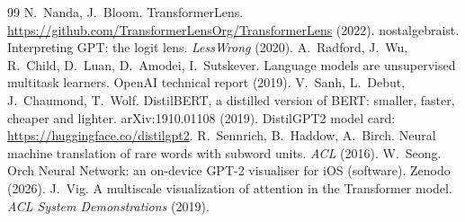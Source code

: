 \documentclass[11pt]{article}
\begin{document}
\begin{thebibliography}{99}
 N.~Nanda, J.~Bloom. TransformerLens. \url{https://github.com/TransformerLensOrg/TransformerLens} (2022).
 nostalgebraist. Interpreting GPT: the logit lens. \emph{LessWrong} (2020).
 A.~Radford, J.~Wu, R.~Child, D.~Luan, D.~Amodei, I.~Sutskever. Language models are unsupervised multitask learners. OpenAI technical report (2019).
 V.~Sanh, L.~Debut, J.~Chaumond, T.~Wolf. DistilBERT, a distilled version of BERT: smaller, faster, cheaper and lighter. arXiv:1910.01108 (2019). DistilGPT2 model card: \url{https://huggingface.co/distilgpt2}.
 R.~Sennrich, B.~Haddow, A.~Birch. Neural machine translation of rare words with subword units. \emph{ACL} (2016).
 W.~Seong. Orch Neural Network: an on-device GPT-2 visualiser for iOS (software). Zenodo (2026). 
 J.~Vig. A multiscale visualization of attention in the Transformer model. \emph{ACL System Demonstrations} (2019).
\end{thebibliography}
\end{document}
